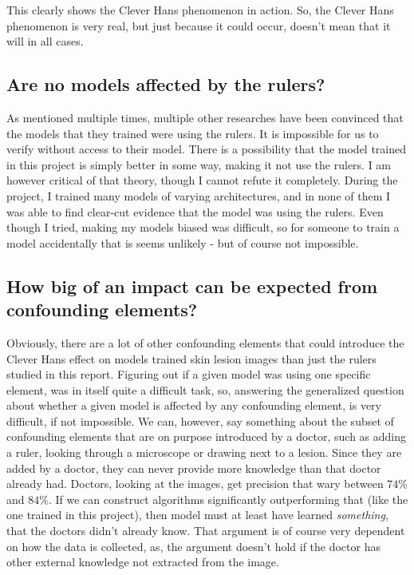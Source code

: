 This clearly shows the Clever Hans phenomenon in action. So, the Clever Hans phenomenon is very real, but just because it could occur, doesn't mean that it will in all cases.
\subsection{Are no models affected by the rulers?}
As mentioned multiple times, multiple other researches have been convinced that the models that 
they trained were using the rulers.
It is impossible for us to verify without access to their model.
There is a possibility that the model trained in this project is simply better in some way, making it not use the rulers.
I am however critical of that theory, though I cannot refute it completely.
During the project, I trained many models of varying architectures,
and in none of them I was able to find clear-cut evidence that the model was using the rulers.
Even though I tried, making my models biased was difficult, 
so for someone to train a model accidentally that is seems unlikely - but of course not impossible.

\subsection{How big of an impact can be expected from confounding elements?}
Obviously, there are a lot of other confounding elements that could introduce the Clever Hans effect on models trained 
skin lesion images than just the rulers studied in this report.
Figuring out if a given model was using one specific element, 
was in itself quite a difficult task, 
so, answering the generalized question about whether a given model is affected by any confounding element,
is very difficult, if not impossible.
We can, however, say something about the subset of confounding elements that are on purpose introduced by a doctor, 
such as adding a ruler, looking through a microscope or drawing next to a lesion.
Since they are added by a doctor, they can never provide more knowledge than that doctor already had.
Doctors, looking at the images, get precision that wary between $74\%$ and $84\%$\cite{multi-class-skin-lesion-hybrid}.
If we can construct algorithms significantly outperforming that (like the one trained in this project),
then model must at least have learned \textit{something}, that the doctors didn't already know.
That argument is of course very dependent on how the data is collected,
as, the argument doesn't hold if the doctor has other external knowledge not extracted from the image.

